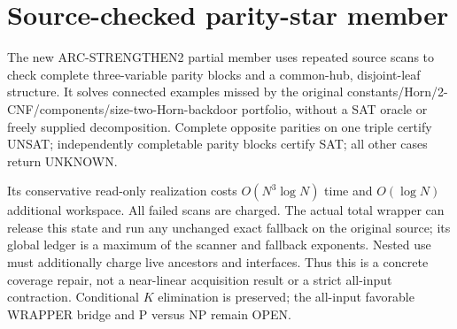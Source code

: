 \section{Source-checked parity-star member}
The new ARC-STRENGTHEN2 partial member uses repeated source scans to
check complete three-variable parity blocks and a common-hub,
disjoint-leaf structure. It solves connected examples missed by the
original constants/Horn/2-CNF/components/size-two-Horn-backdoor portfolio,
without a SAT oracle or freely supplied decomposition. Complete opposite
parities on one triple certify UNSAT; independently completable parity
blocks certify SAT; all other cases return UNKNOWN.

Its conservative read-only realization costs $O(N^3\log N)$ time and
$O(\log N)$ additional workspace. All failed scans are charged. The
actual total wrapper can release this state and run any unchanged exact
fallback on the original source; its global ledger is a maximum of the
scanner and fallback exponents. Nested use must additionally charge
live ancestors and interfaces. Thus this is a concrete coverage repair,
not a near-linear acquisition result or a strict all-input contraction.
Conditional $K$ elimination is preserved; the all-input favorable
WRAPPER bridge and P versus NP remain OPEN.
